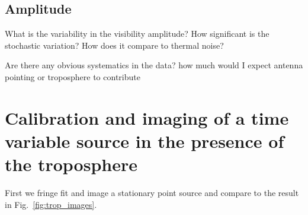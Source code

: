 \subsection{Amplitude}

What is the variability in the visibility amplitude? How significant is the stochastic variation? How does it compare to thermal noise?

Are there any obvious systematics in the data? how much would I expect antenna pointing or troposphere to contribute


\section{Calibration and imaging of a time variable source in the presence of the troposphere}

First we fringe fit and image a stationary point source and compare to the result in Fig.~\ref{fig:trop_images}. 








